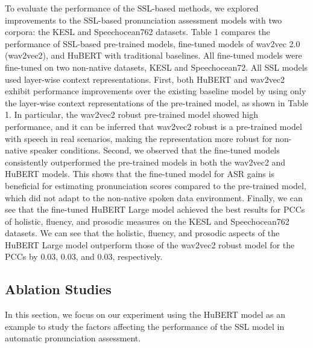 \documentclass[a4paper]{article}
\begin{document}
To evaluate the performance of the SSL-based methods, we explored improvements to the SSL-based pronunciation assessment models with two corpora: the KESL and Speechocean762 datasets. Table 1 compares the performance of SSL-based pre-trained models, fine-tuned models of wav2vec 2.0 (wav2vec2), and HuBERT with traditional baselines. All fine-tuned models were fine-tuned on two non-native datasets, KESL and Speechocean72. All SSL models used layer-wise context representations. First, both HuBERT and wav2vec2 exhibit performance improvements over the existing baseline model by using only the layer-wise context representations of the pre-trained model, as shown in Table 1. In particular, the wav2vec2 robust pre-trained model \cite{hsu21_interspeech} showed high performance, and it can be inferred that wav2vec2 robust is a pre-trained model with speech in real scenarios, making the representation more robust for non-native speaker conditions. Second, we observed that the fine-tuned models consistently outperformed the pre-trained models in both the wav2vec2 and HuBERT models. This shows that the fine-tuned model for ASR gains is beneficial for estimating pronunciation scores compared to the pre-trained model, which did not adapt to the non-native spoken data environment. Finally, we can see that the fine-tuned HuBERT Large model achieved the best results for PCCs of holistic, fluency, and prosodic measures on the KESL and Speechocean762 datasets. We can see that the holistic, fluency, and prosodic aspects of the HuBERT Large model outperform those of the wav2vec2 robust model for the PCCs by $0.03$, $0.03$, and $0.03$, respectively.


\subsection{Ablation Studies}

In this section, we focus on our experiment using the HuBERT model as an example to study the factors affecting the performance of the SSL model in automatic pronunciation assessment.
\end{document}
